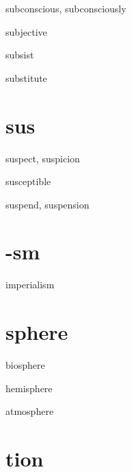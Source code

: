 \begin{RefWord}{subconscious, subconsciously}
\end{RefWord}

\begin{RefWord}{subjective}
\end{RefWord}

\begin{RefWord}{subsist}
\end{RefWord}

\begin{RefWord}{substitute}
\end{RefWord}

\section{sus}

\begin{RefWord}{suspect, suspicion}
\end{RefWord}

\begin{RefWord}{susceptible}
\end{RefWord}

\begin{RefWord}{suspend, suspension}
\end{RefWord}

\section{-sm}

\begin{RefWord}{imperialism}
\end{RefWord}

\section{sphere}
\begin{RefWord}{biosphere}
\end{RefWord}

\begin{RefWord}{hemisphere}
\end{RefWord}

\begin{RefWord}{atmosphere}
\end{RefWord}

\section{tion}


